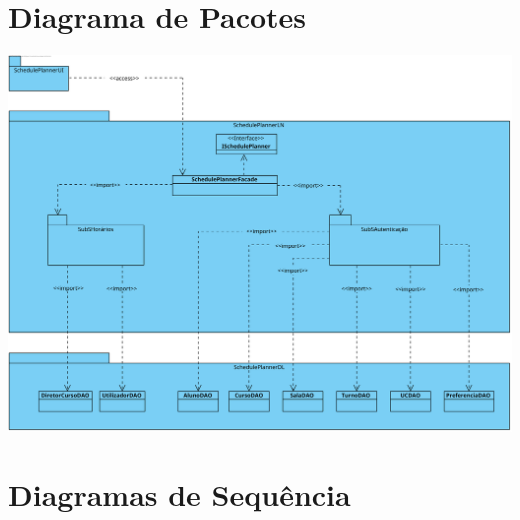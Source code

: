 \documentclass[a4paper,12pt]{scrreprt}
\begin{document}


\chapter{Diagrama de Pacotes}
\vspace{1cm}

\begin{minipage}{\textwidth}
    \centering
    \includegraphics[width=1\textwidth]{images/packages-diagram.png}
    \label{fig:6-1-diagrama_de_pacotes}
\end{minipage}



\chapter{Diagramas de Sequência}
\vspace{1cm}
\end{document}
